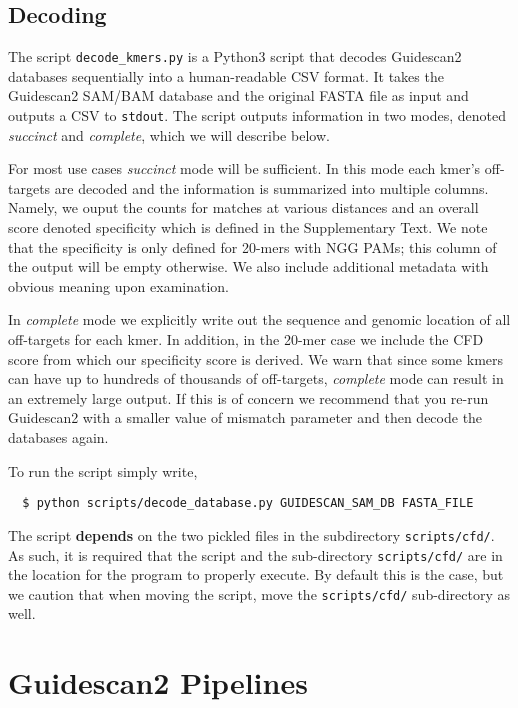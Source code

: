 \documentclass[11pt]{article}
\begin{document}
\subsection{Decoding}

The script \texttt{decode\_kmers.py} is a Python3 script that decodes
Guidescan2 databases sequentially into a human-readable CSV format. It
takes the Guidescan2 SAM/BAM database and the original FASTA file as
input and outputs a CSV to \texttt{stdout}. The script outputs
information in two modes, denoted {\it succinct} and {\it
  complete}, which we will describe below.

For most use cases {\it succinct} mode will be sufficient. In this
mode each kmer's off-targets are decoded and the information is
summarized into multiple columns. Namely, we ouput the counts for
matches at various distances and an overall score denoted specificity
which is defined in the Supplementary Text. We note that the
specificity is only defined for 20-mers with NGG PAMs; this column of
the output will be empty otherwise. We also include additional
metadata with obvious meaning upon examination.

In {\it complete} mode we explicitly write out the sequence and
genomic location of all off-targets for each kmer. In addition, in the
20-mer case we include the CFD score from which our specificity score
is derived. We warn that since some kmers can have up to hundreds of
thousands of off-targets, {\it complete} mode can result in an
extremely large output. If this is of concern we recommend that you
re-run Guidescan2 with a smaller value of mismatch parameter and then
decode the databases again.

To run the script simply write,
\begin{verbatim}
  $ python scripts/decode_database.py GUIDESCAN_SAM_DB FASTA_FILE 
\end{verbatim}
The script \textbf{depends} on the two pickled files in the
subdirectory \texttt{scripts/cfd/}. As such, it is required that the
script and the sub-directory \texttt{scripts/cfd/} are in the location
for the program to properly execute. By default this is the
case, but we caution that when moving the script, move the
\texttt{scripts/cfd/} sub-directory as well.

\section{Guidescan2 Pipelines}
\end{document}
